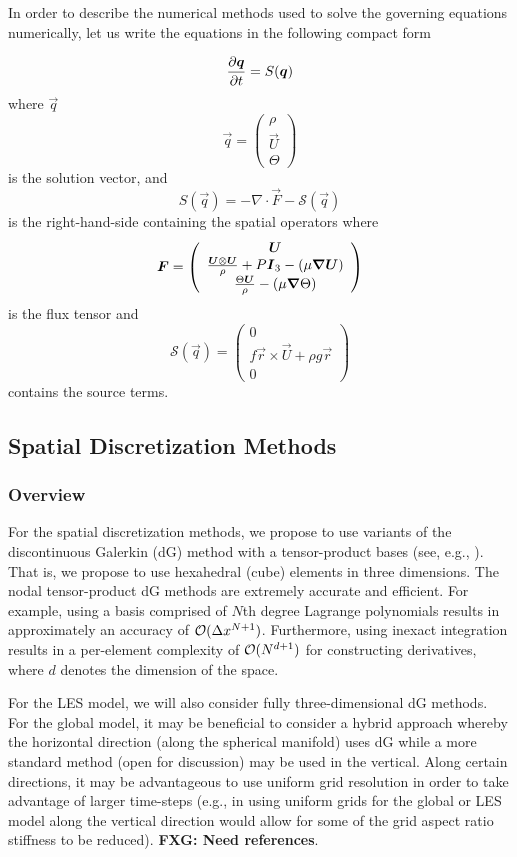 \documentclass{article}
\begin{document}
In order to describe the numerical methods used to solve the governing equations numerically, let us write the equations in the following compact form

\[
\frac{\partial \boldsymbol{{q}}}{\partial t} = S(\boldsymbol{{q}})
\]
where $\vec{q}$
\[
\vec{q}=\left( \begin{array}{c}
\rho \\
\vec{U} \\
\Theta
\end{array}
\right)
\]
 is the solution vector, 
 and 
 \[
 S(\vec{q}) = - \nabla \cdot \vec{F} - \mathcal{S}(\vec{q})
 \]
 is the right-hand-side containing the spatial operators where 
 \[
 \boldsymbol{{F}}=\left( \begin{array}{c}
 \boldsymbol{{U}} \\
 \frac{\boldsymbol{{U}} \otimes \boldsymbol{{U}}}{\rho} + P \boldsymbol{{I}}_3 - \left( \mu \boldsymbol{{\nabla}} \boldsymbol{{U}} \right) \\
\frac{\Theta \boldsymbol{{U}}}{\rho} - \left( \mu \boldsymbol{{\nabla}} \Theta \right)
\end{array}
\right)
 \]
 is the flux tensor and
 \[
 \mathcal{S}(\vec{q})=\left( \begin{array}{c}
 0 \\
 f \vec{r} \times \vec{U} + \rho g \vec{r} \\
0 
\end{array}
\right)
 \]
contains the source terms. 

\subsection{Spatial Discretization Methods}

\subsubsection{Overview}
For the spatial discretization methods, we propose to use variants of the discontinuous Galerkin (dG) method with a tensor-product bases (see, e.g., \citet{giraldo:2008a, abdi:2016}). That is, we propose to use hexahedral (cube) elements in three dimensions.  The nodal tensor-product dG methods are extremely accurate and efficient.  For example, using a basis comprised of $N$th degree Lagrange polynomials results in approximately an accuracy of $\mathcal{O}(\Delta x^{N+1})$. Furthermore, using inexact integration results in a per-element complexity of $\mathcal{O}(N^{d+1})$ for constructing derivatives, where $d$ denotes the dimension of the space. 

For the LES model, we will also consider fully three-dimensional dG methods. For the global model, it may be beneficial to consider a hybrid approach whereby the horizontal direction (along the spherical manifold) uses dG while a more standard method (open for discussion) may be used in the vertical.  Along certain directions, it may be advantageous to use uniform grid resolution in order to take advantage of larger time-steps (e.g., in using uniform grids for the global or LES model along the vertical direction would allow for some of the grid aspect ratio stiffness to be reduced).  \textbf{FXG: Need references}.
\end{document}

